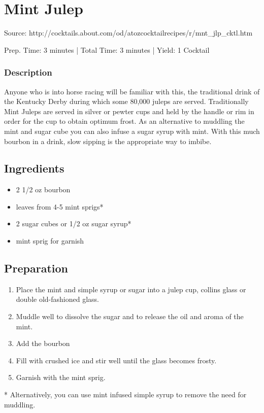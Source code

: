 \section{Mint Julep}

Source: http://cocktails.about.com/od/atozcocktailrecipes/r/mnt\_jlp\_cktl.htm

\begin{center}
Prep. Time: 3 minutes |
Total Time: 3 minutes | 
Yield: 1 Cocktail
\end{center}

\subsubsection{Description}
Anyone who is into horse racing will be familiar with this, the traditional drink of the Kentucky Derby during which some 80,000 juleps are served. Traditionally Mint Juleps are served in silver or pewter cups and held by the handle or rim in order for the cup to obtain optimum frost. As an alternative to muddling the mint and sugar cube you can also infuse a sugar syrup with mint. With this much bourbon in a drink, slow sipping is the appropriate way to imbibe. 

\subsection{Ingredients}
\begin{itemize}
    \item 2 1/2 oz bourbon
    \item leaves from 4-5 mint sprigs*
    \item 2 sugar cubes or 1/2 oz sugar syrup*
    \item mint sprig for garnish
\end{itemize}

\subsection{Preparation}
\begin{enumerate}
    \item Place the mint and simple syrup or sugar into a julep cup, collins glass or double old-fashioned glass.
    \item Muddle well to dissolve the sugar and to release the oil and aroma of the mint.
    \item Add the bourbon
    \item Fill with crushed ice and stir well until the glass becomes frosty.
    \item Garnish with the mint sprig. 
\end{enumerate}

* Alternatively, you can use mint infused simple syrup to remove the need for muddling.
